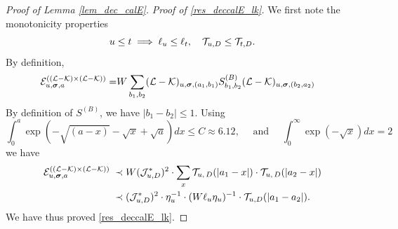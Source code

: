 \documentclass[10pt,reqno]{article}
\theoremstyle{plain} %
\theoremstyle{remark}
\numberwithin{equation}{section}
\begin{document}
 \begin{proof}[Proof of Lemma \ref{lem_dec_calE}]
\emph{Proof of \eqref{res_deccalE_lk}.}  
We first  note the monotonicity properties 
$$
u\le t\implies \ell_u\le \ell_t,   \quad {\cal T}_{u,D}\le {\cal T}_{t,D} .$$
By definition, 
\begin{align} {\cal E}^{( ({\cal L-K})\times({\cal L-K}) )}_{u,  \boldsymbol{\sigma},  \textbf{a} }
= &W\sum_{b_1,b_2}({\cal L-K})_{u,
\boldsymbol{\sigma}, 
( a_1, b_1)
}
S^{(B)}_{b_1,b_2}
({\cal L-K})_{u,  \boldsymbol{\sigma},  ( b_2, a_2)}
\end{align}
By definition of $S^{(B)}$,  we have $|b_1-b_2|\le 1$.  
Using 
$$
\int_{0 }^a\exp\left(-\sqrt{(a-x)}-\sqrt x+ \sqrt a\right)dx\le C\approx 6.12
,\quad \text{ and } \quad 
\int_{0 }^\infty\exp\left({-\sqrt x}\right)dx=2
$$
we have 
\begin{align}\nonumber
{\cal E}^{( ({\cal L-K})\times({\cal L-K}) )}_{u,  \boldsymbol{\sigma},  \textbf{a} }
\; \prec \;& W ({\cal J}_{u,D}^*) ^2\cdot 
\sum_{x }  {\cal T}_{u, \,D}(|a_1-x|) \cdot {\cal T}_{u, \,D}(|a_2-x|)   
\\\label{mmxiaoxi}
\; \prec \;&
({\cal J}_{u,D}^*) ^2 \cdot 
 \eta_u^{-1}\cdot (W\ell_u\eta_u)^{-1}\cdot  {\cal T}_{u,D }(|a_1-a_2|) .
\end{align} 
We  have thus proved   \eqref{res_deccalE_lk}.


\end{proof}
\end{document}
